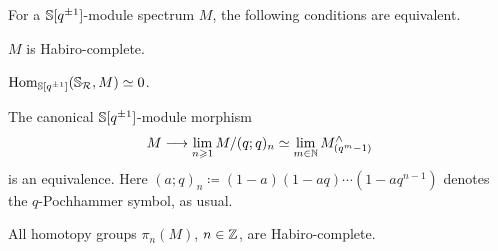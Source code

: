 \documentclass[DIV=12,numbers=enddot,leqno,bibliography=totoc]{scrartcl}
\begin{document}
	\begin{lem}\label{lem:HabiroComplete}
		For a $\mathbb{S}[q^{\pm 1}]$-module spectrum $M$, the following conditions are equivalent.
		\begin{alphanumerate}
			\item $M$ is Habiro-complete.\label{enum:HabiroComplete}
			\item $\operatorname{Hom}_{\mathbb{S}[q^{\pm 1}]}(\mathbb{S}_{\mathcal{R}},M)\simeq 0$.\label{enum:HabiroCompleteKillingSRr}
			\item The canonical $\mathbb{S}[q^{\pm 1}]$-module morphism
			\begin{equation*}
				M\longrightarrow \operatorname*{lim}_{n\geqslant 1}M/(q;q)_n\simeq \operatorname*{lim}_{m\in\mathbb{N}}M_{(q^m-1)}^\wedge
			\end{equation*}
			is an equivalence. Here $(a;q)_n\coloneqq (1-a)(1-aq)\dotsm(1-aq^{n-1})$ denotes the $q$-Pochhammer symbol, as usual.\label{enum:HabiroCompletion}
			\item All homotopy groups $\pi_n(M)$, $n\in\mathbb{Z}$, are Habiro-complete.\label{enum:HabiroCompleteHomotopyGroups}
		\end{alphanumerate}
	\end{lem}
\end{document}
